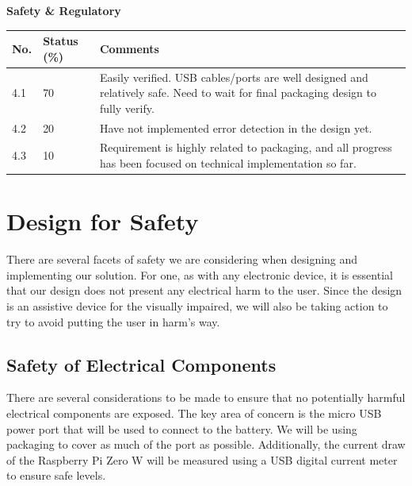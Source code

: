 \documentclass[a4paper,11pt]{article}
\begin{document}
\textbf{Safety \& Regulatory}
\begin{table}[ht]
    \centering
    \begin{tabular}{|p{0.7cm}|p{1cm}|p{12cm}|}
        \hline
        No. & Status (\%) & Comments \\ \hline
        
        4.1 & 70 & Easily verified. USB cables/ports are well designed and relatively safe. Need to wait for final packaging design to fully verify. \\ \hline
        
        4.2 & 20 & Have not implemented error detection in the design yet. \\ \hline
        
        4.3 & 10 & Requirement is highly related to packaging, and all progress has been focused on technical implementation so far. \\ \hline

    \end{tabular}
\end{table}

\section{Design for Safety}
There are several facets of safety we are considering when designing and implementing our solution. For one, as with any electronic device, it is essential that our design does not present any electrical harm to the user. Since the design is an assistive device for the visually impaired, we will also be taking action to try to avoid putting the user in harm's way.

\subsection{Safety of Electrical Components}
There are several considerations to be made to ensure that no potentially harmful electrical components are exposed. The key area of concern is the micro USB power port that will be used to connect to the battery. We will be using packaging to cover as much of the port as possible. Additionally, the current draw of the Raspberry Pi Zero W will be measured using a USB digital current meter to ensure safe levels.
\end{document}
